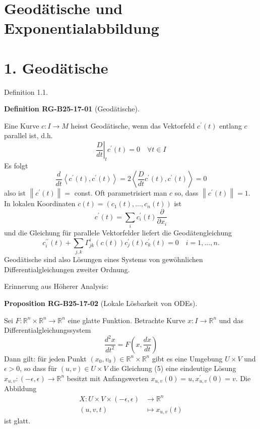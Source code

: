 \documentclass[10pt, letterpaper]{article}
\newcommand{\CustomHeading}[3]{%
  \par\medskip\noindent%
  \textbf{#1 #2} \textnormal{(#3)}.\enskip%
}
\newenvironment{DEF}[2]{\begin{unitbox}\CustomHeading{Definition}{#1}{#2}}{\end{unitbox}}
\newenvironment{PROP}[2]{\begin{unitbox}\CustomHeading{Proposition}{#1}{#2}}{\end{unitbox}}
\begin{document}
\section*{Geodätische und Exponentialabbildung}
\section*{1. Geodätische}



Definition 1.1. 


\begin{DEF}{RG-B25-17-01}{Geodätische}
Eine Kurve $c: I \rightarrow M$ heisst Geodätische, wenn das Vektorfeld $c^{\prime}(t)$ entlang $c$ parallel ist, d.h.
$$
\left.\frac{D}{d t}\right|_{t} c^{\prime}(t)=0 \quad \forall t \in I
$$
Es folgt
$$
\frac{d}{d t}\left\langle c^{\prime}(t), c^{\prime}(t)\right\rangle=2\left\langle\frac{D}{d t} c^{\prime}(t), c^{\prime}(t)\right\rangle=0
$$
also ist $\left\|c^{\prime}(t)\right\|=$ const. Oft parametrisiert man $c$ so, dass $\left\|c^{\prime}(t)\right\|=1$.\\

In lokalen Koordinaten $c(t)=\left(c_{1}(t), \ldots, c_{n}(t)\right)$ ist 
$$c^{\prime}(t)=\sum_{i} c_{i}^{\prime}(t) \frac{\partial}{\partial x_{i}}$$ 
und die Gleichung für parallele Vektorfelder liefert die Geodätengleichung
$$
c_{i}^{\prime \prime}(t)+\sum_{j, k} \Gamma_{j k}^{i}(c(t)) c_{j}^{\prime}(t) c_{k}^{\prime}(t)=0 \quad i=1, \ldots, n .
$$
Geodätische sind also Lösungen eines Systems von gewöhnlichen Differentialgleichungen zweiter Ordnung.
\end{DEF}



Erinnerung aus Höherer Analysis: 


\begin{PROP}{RG-B25-17-02}{Lokale Lösbarkeit von ODEs}
Sei $F: \mathbb{R}^{n} \times \mathbb{R}^{n} \rightarrow \mathbb{R}^{n}$ eine glatte Funktion. Betrachte Kurve $x: I \rightarrow \mathbb{R}^{n}$ und das Differentialgleichungssystem
\begin{equation*}
\frac{d^{2} x}{d t^{2}}=F\left(x, \frac{d x}{d t}\right) \tag{5}
\end{equation*}
Dann gilt: für jeden Punkt $\left(x_{0}, v_{0}\right) \in \mathbb{R}^{n} \times \mathbb{R}^{n}$ gibt es eine Umgebung $U \times V$ und $\epsilon>0$, so dass für $(u, v) \in U \times V$ die Gleichung (5) eine eindeutige Lösung $x_{u, v}:(-\epsilon, \epsilon) \rightarrow \mathbb{R}^{n}$ besitzt mit Anfangswerten $x_{u, v}(0)=u, x_{u, v}^{\prime}(0)=v$. Die Abbildung
$$
\begin{aligned}
X: U \times V \times(-\epsilon, \epsilon) & \rightarrow \mathbb{R}^{n} \\
(u, v, t) & \mapsto x_{u, v}(t)
\end{aligned}
$$
ist glatt.
\end{PROP}
\end{document}
